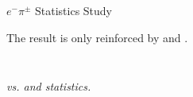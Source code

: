 \begin{frame}{$e^-\pi^\pm$ Statistics Study}
    \label{12.22::pi_statistics_study}

    The result is only reinforced by  and .

    \vspace{-12pt}

    \begin{columns}[onlytextwidth,T]

    \begin{column}{.49\linewidth}
        \begin{center}
            \begin{figure}[t]
            \end{figure}
        \end{center}
    \end{column}

    \begin{column}{.49\linewidth}
        \begin{center}
            \begin{figure}[t]
            \end{figure}
        \end{center}
    \end{column}

    \end{columns}

    \vspace{-18pt}

    \begin{center}
        \scriptsize{\textit{ vs. \ef{$\pi^+$} and \ef{$\pi^-$} statistics.}}
    \end{center}
\end{frame}
